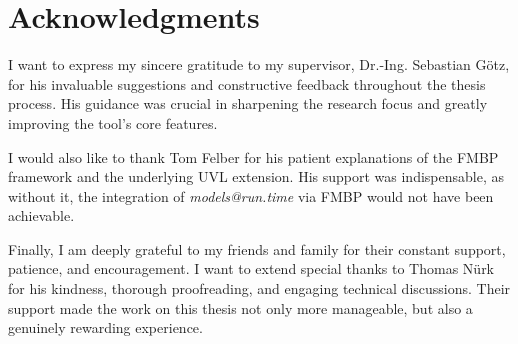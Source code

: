 \chapter*{\Large Acknowledgments}
\thispagestyle{empty}

I want to express my sincere gratitude to my supervisor, Dr.-Ing. Sebastian Götz, for his invaluable suggestions and constructive feedback throughout the thesis process.
His guidance was crucial in sharpening the research focus and greatly improving the tool's core features.

I would also like to thank Tom Felber for his patient explanations of the FMBP framework and the underlying UVL extension.
His support was indispensable, as without it, the integration of \textit{models@run.time} via FMBP would not have been achievable.

Finally, I am deeply grateful to my friends and family for their constant support, patience, and encouragement.
I want to extend special thanks to Thomas Nürk for his kindness, thorough proofreading, and engaging technical discussions.
Their support made the work on this thesis not only more manageable, but also a genuinely rewarding experience.